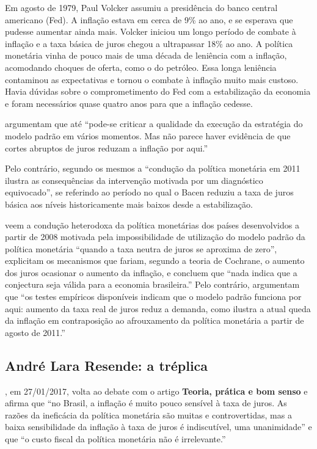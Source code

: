 \documentclass[
	10pt,				%
	openright,			%
	twoside,			%
	a5paper,			%
	english,			%
	french,				%
	spanish,			%
	brazil				%
	]{abntex2}
\renewenvironment{quote}
  {\small\list{}{\rightmargin=0.1cm \leftmargin=4cm}%
   \item\relax}
  {\endlist}
\begin{document}
\begin{quote}
Em agosto de 1979, Paul Volcker assumiu a presidência do banco central
americano (Fed). A inflação estava em cerca de 9\% ao ano, e se esperava
que pudesse aumentar ainda mais. Volcker iniciou um longo período de
combate à inflação e a taxa básica de juros chegou a ultrapassar 18\% ao
ano. A política monetária vinha de pouco mais de uma década de leniência
com a inflação, acomodando choques de oferta, como o do petróleo. Essa
longa leniência contaminou as expectativas e tornou o combate à inflação
muito mais custoso. Havia dúvidas sobre o comprometimento do Fed com a
estabilização da economia e foram necessários quase quatro anos para que
a inflação cedesse.
\end{quote}

 argumentam que até ``pode-se criticar a
qualidade da execução da estratégia do modelo padrão em vários momentos.
Mas não parece haver evidência de que cortes abruptos de juros reduzam a
inflação por aqui.''

Pelo contrário, segundo os mesmos a ``condução da política monetária em
2011 ilustra as consequências da intervenção motivada por um diagnóstico
equivocado'', se referindo ao período no qual o Bacen reduziu a taxa de
juros básica aos níveis historicamente mais baixos desde a
estabilização.

 veem a condução heterodoxa da política
monetárias dos países desenvolvidos a partir de 2008 motivada pela
impossibilidade de utilização do modelo padrão da política monetária
``quando a taxa neutra de juros se aproxima de zero'', explicitam os
mecanismos que fariam, segundo a teoria de Cochrane, o aumento dos juros
ocasionar o aumento da inflação, e concluem que ``nada indica que a
conjectura seja válida para a economia brasileira.'' Pelo contrário,
argumentam que ``os testes empíricos disponíveis indicam que o modelo
padrão funciona por aqui: aumento da taxa real de juros reduz a demanda,
como ilustra a atual queda da inflação em contraposição ao afrouxamento
da política monetária a partir de agosto de 2011.''

\subsection{André Lara Resende: a
tréplica}\label{andruxe9-lara-resende-a-truxe9plica}

, em 27/01/2017, volta ao debate com o artigo
\textbf{Teoria, prática e bom senso} \cite{resende2} e afirma que ``no
Brasil, a inflação é muito pouco sensível à taxa de juros. As razões da
ineficácia da política monetária são muitas e controvertidas, mas a
baixa sensibilidade da inflação à taxa de juros é indiscutível, uma
unanimidade'' e que ``o custo fiscal da política monetária não é
irrelevante.''
\end{document}
